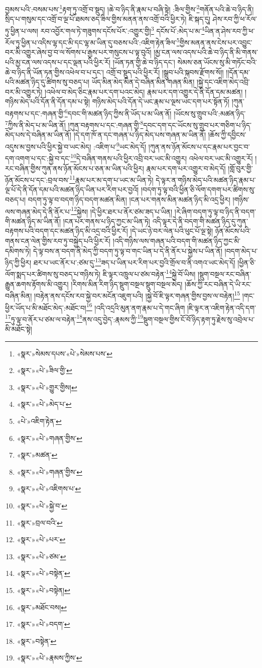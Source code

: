 བྱམས་པའི་:བསམ་པས་\footnote{«སྣར་»སེམས་དཔས་«པེ་»སེམས་པས་}རྟག་ཏུ་འགྲོ་བ་སྡུད། །ཆེ་བ་ཉིད་ནི་རྣམ་པ་བཞི་སྟེ། :ཟིལ་གྱིས་\footnote{«སྣར་»«པེ་»ཟིལ་གྱི་}གནོན་པའི་ཆེ་བ་ཉིད་ནི། སྲིད་པ་གསུམ་དང་འགྲོ་བ་ལྔ་པོ་ཐམས་ཅད་ཟིལ་གྱིས་མནན་ནས་འགྲོ་བའི་ཕྱིར་ཏེ། ཇི་སྐད་དུ། ཤེས་རབ་ཀྱི་ཕ་རོལ་ཏུ་ཕྱིན་པ་ལས། རབ་འབྱོར་གལ་ཏེ་གཟུགས་དངོས་པོར་:འགྱུར་གྱི།\footnote{«སྣར་»«པེ་»གྱུར་གྱིས།} དངོས་པོ་:མེད་པ་མ་\footnote{«སྣར་»«པེ་»མེད་པ་}ཡིན་ན་ཤེས་རབ་ཀྱི་ཕ་རོལ་ཏུ་ཕྱིན་པ་འདིས་ལྷ་དང་མི་དང་ལྷ་མ་ཡིན་དུ་བཅས་པའི་:འཇིག་རྟེན་ཟིལ་\footnote{«པེ་»འཇིག་རྟེན་}གྱིས་མནན་ནས་ངེས་པར་འབྱུང་བར་མི་འགྱུར་ཞེས་བྱ་བ་ལ་སོགས་པ་རྒྱས་པར་གསུངས་པ་ལྟ་བུའོ། །མྱ་ངན་ལས་འདས་པའི་ཆེ་བ་ཉིད་ནི་མི་གནས་པའི་མྱ་ངན་ལས་འདས་པ་དང་ལྡན་པའི་ཕྱིར་རོ། །ཡོན་ཏན་གྱི་ཆེ་བ་ཉིད་དང་། སེམས་ཅན་ཡོངས་སུ་མི་གཏོང་བའི་ཆེ་བ་ཉིད་ནི་ཡོན་ཏན་གྱིས་འཕེལ་བ་པ་དང་། འགྲོ་བ་སྡུད་པའི་ཕྱིར་རོ། །སྒྲུབ་པའི་སྐབས་རྫོགས་སོ།། །།དོན་དམ་པའི་མཚན་ཉིད་དུ་ཚིགས་སུ་བཅད་པ། ཡོད་མིན་མེད་མིན་དེ་བཞིན་མིན་གཞན་མིན། །སྐྱེ་དང་འཇིག་མེད་འབྲི་བར་མི་འགྱུར་ཏེ། །འཕེལ་བ་མེད་ཅིང་རྣམ་པར་དག་པའང་མེད། རྣམ་པར་དག་འགྱུར་དེ་ནི་དོན་དམ་མཚན། །གཉིས་མེད་པའི་དོན་ནི་དོན་དམ་པ་སྟེ། གཉིས་མེད་པའི་དོན་དེ་ཡང་རྣམ་པ་ལྔས་ཡང་དག་པར་སྟོན་ཏོ། །ཀུན་བརྟགས་པ་དང་:གཞན་གྱི་\footnote{«སྣར་»«པེ་»གཞན་གྱིས་}དབང་གི་མཚན་ཉིད་ཀྱིས་ནི་ཡོད་པ་མ་ཡིན་ནོ། །ཡོངས་སུ་གྲུབ་པའི་:མཚན་ཉིད་\footnote{«སྣར་»མཚན་}ཀྱིས་ནི་མེད་པ་མ་ཡིན་ནོ། །ཀུན་བརྟགས་པ་དང་:གཞན་གྱི་\footnote{«སྣར་»«པེ་»གཞན་གྱིས་}དབང་དག་དང་ཡོངས་སུ་གྲུབ་པར་གཅིག་པ་ཉིད་མེད་པས་དེ་བཞིན་མ་ཡིན་ནོ། །དེ་དག་ཁོ་ན་དང་གཞན་པ་ཉིད་མེད་པས་གཞན་མ་ཡིན་ནོ། །ཆོས་ཀྱི་དབྱིངས་འདུས་མ་བྱས་པའི་ཕྱིར་སྐྱེ་བ་ཡང་མེད། :འཇིག་པ་\footnote{«སྣར་»«པེ་»འཇིགས་པ་}ཡང་མེད་དོ། །ཀུན་ནས་ཉོན་མོངས་པ་དང་རྣམ་པར་བྱང་བ་དག་འགག་པ་དང་:སྐྱེ་བ་དང་\footnote{«སྣར་»«པེ་»སྐྱེ་བ་}དེ་བཞིན་གནས་པའི་ཕྱིར་འབྲི་བར་ཡང་མི་འགྱུར། འཕེལ་བར་ཡང་མི་འགྱུར་རོ། །རང་བཞིན་གྱིས་ཀུན་ནས་ཉོན་མོངས་པ་ཅན་མ་ཡིན་པའི་ཕྱིར། རྣམ་པར་དག་པར་འགྱུར་བ་མེད་དོ། །གློ་བུར་གྱི་ཉོན་མོངས་པ་དང་:བྲལ་བས་\footnote{«སྣར་»བྲལ་བའི་}རྣམ་པར་མ་དག་པ་ཡང་མ་ཡིན་ཏེ། དེ་ལྟར་ན་གཉིས་མེད་པའི་མཚན་ཉིད་རྣམ་པ་ལྔ་པོ་དེ་ནི་དོན་དམ་པའི་མཚན་ཉིད་ཡིན་པར་རིག་པར་བྱའོ། །བདག་ཏུ་ལྟ་བའི་ཕྱིན་ཅི་ལོག་དགག་པར་ཚིགས་སུ་བཅད་པ། བདག་ཏུ་ལྟ་བ་བདག་ཉིད་བདག་མཚན་མིན། །ངན་པར་གནས་མིན་མཚན་ཉིད་མི་འདྲ་ཕྱིར། །གཉིས་ལས་གཞན་མེད་དེ་ནི་ནོར་པ་\footnote{«སྣར་»«པེ་»པར་}སྐྱེས། །དེ་ཕྱིར་ཐར་པ་ནོར་ཙམ་ཟད་པ་ཡིན། །རེ་ཞིག་བདག་ཏུ་ལྟ་བ་ཉིད་ནི་བདག་གི་མཚན་ཉིད་མ་ཡིན་ནོ། །ངན་པར་གནས་པ་ཉིད་ཀྱང་མ་ཡིན་ཏེ། འདི་ལྟར་དེ་ནི་བདག་གི་མཚན་ཉིད་དུ་ཀུན་བརྟགས་པའི་བདག་དང་མཚན་ཉིད་མི་འདྲ་བའི་ཕྱིར་རོ། །དེ་ཡང་ཉེ་བར་ལེན་པའི་ཕུང་པོ་ལྔ་སྟེ། ཉོན་མོངས་པའི་གནས་ངན་ལེན་གྱིས་རབ་ཏུ་བསྐྱེད་པའི་ཕྱིར་རོ། །འདི་གཉིས་ལས་གཞན་པའི་བདག་གི་མཚན་ཉིད་ཀྱང་མི་དམིགས་ཏེ། དེ་ལྟ་བས་ན་བདག་ནི་མེད་ཀྱི་བདག་ཏུ་ལྟ་བ་གང་ཡིན་པ་དེ་ནི་ནོར་པ་སྐྱེས་པ་ཡིན་ནོ། །བདག་མེད་པ་ཉིད་ཀྱི་ཕྱིར། ཐར་པ་ཡང་ནོར་པ་:ཙམ་དུ་\footnote{«སྣར་»«པེ་»ཙམ་}ཟད་པ་ཡིན་པར་རིག་པར་བྱའི་གྲོལ་བ་ནི་འགའ་ཡང་མེད་དོ། །ཕྱིན་ཅི་ལོག་སྨད་པར་ཚིགས་སུ་བཅད་པ་གཉིས་ཏེ། ཇི་ལྟར་འཁྲུལ་པ་ཙམ་བརྟེན་\footnote{«སྣར་»«པེ་»བསྟེན་}སྐྱེ་བོ་ཡིས། །སྡུག་བསྔལ་རང་བཞིན་རྒྱུན་ཆགས་རྟོགས་མི་འགྱུར། །རིགས་མིན་རིག་ཉིད་སྡུག་བསྔལ་སྡུག་བསྔལ་མེད། །ཆོས་ཀྱི་རང་བཞིན་དེ་ཡི་རང་བཞིན་མིན། །བརྟེན་ནས་དངོས་རབ་སྐྱེ་བར་མངོན་འཇུག་པའི། །སྐྱེ་བོ་ཇི་ལྟར་གཞན་གྱིས་བྱས་ལ་བརྟེན།\footnote{«སྣར་»«པེ་»བསྟེན།} །གང་ཕྱིར་ཡོད་པ་མི་མཐོང་མེད་:མཐོང་བ།\footnote{«སྣར་»མཐོང་བས།} །འདི་འདྲའི་མུན་ནག་རྣམ་པ་དེ་གང་ཞིག །ཇི་ལྟར་ན་འཇིག་རྟེན་འདི་དག་\footnote{«སྣར་»«པེ་»བདག་}ཏུ་ལྟ་བ་ནོར་པ་ཙམ་ལ་བརྟེན་\footnote{«སྣར་»བསྟེན་}ནས་འདུ་བྱེད་:རྣམས་ཀྱི་\footnote{«སྣར་»«པེ་»རྣམས་ཀྱིས་}སྡུག་བསྔལ་གྱིས་ངོ་བོ་ཉིད་རྟག་ཏུ་རྗེས་སུ་འབྲེལ་པ་མི་མཐོང་སྟེ། 